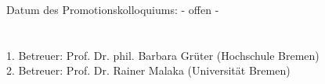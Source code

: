 \begin{singlespace}
\vspace*{160mm}
Datum des Promotionskolloquiums: - offen - \\
\\
\\
1. Betreuer: Prof. Dr. phil. Barbara Grüter (Hochschule Bremen)\\
2. Betreuer: Prof. Dr. Rainer Malaka (Universität Bremen)\\
\end{singlespace}